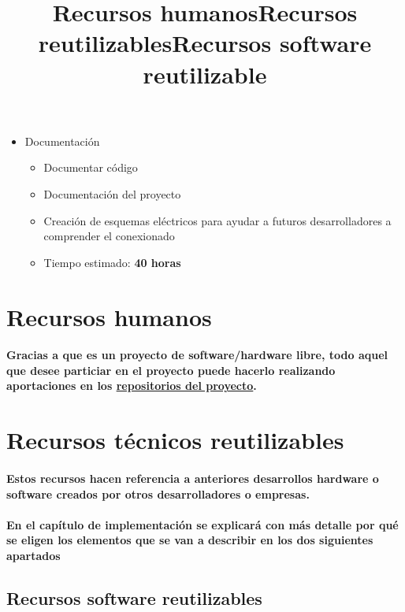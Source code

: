 \begin{itemize}
  \item Documentación
  \begin{itemize}
    \item{Documentar código}
    \item{Documentación del proyecto}
    \item{Creación de esquemas eléctricos para ayudar a futuros desarrolladores
    a comprender el conexionado}
    \item{Tiempo estimado: \textbf{40 horas}}
  \end{itemize}
\end{itemize}



\title{Recursos humanos}
\section{Recursos humanos}

\paragraph{
Gracias a que es un proyecto de software/hardware libre, todo aquel que
desee particiar en el proyecto puede hacerlo realizando aportaciones en los
\href{https://github.com/iblancasa/ArduBand}{repositorios del proyecto}.
}


\title{Recursos reutilizables}
\section{Recursos técnicos reutilizables}

\paragraph{
Estos recursos hacen referencia a anteriores desarrollos hardware o software creados
por otros desarrolladores o empresas.
}

\paragraph{
En el capítulo de implementación se explicará con más detalle por qué se
eligen los elementos que se van a describir en los dos siguientes apartados
}


\subsection{Recursos software reutilizables}
\title{Recursos software reutilizable}



